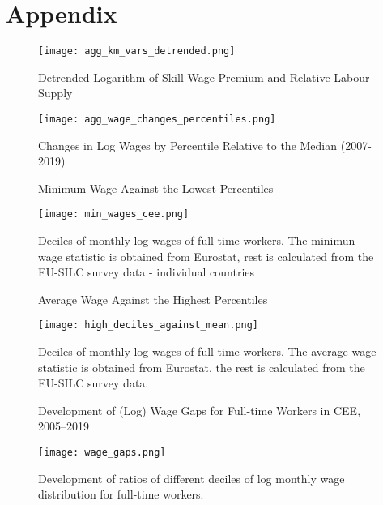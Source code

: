 \documentclass[11pt]{article}
\begin{document}
\newpage
\section{Appendix}



\begin{figure}[!htbp]%
    \centering
    \caption{Detrended Logarithm of Skill Wage Premium and Relative Labour Supply}
    {\texttt{[image: agg\_km\_vars\_detrended.png]} }
    \label{agg_km_vars_detrended}
\end{figure}




\begin{figure}[!htbp]%
    \centering
    \caption{Changes in Log Wages by Percentile Relative to the Median (2007-2019)}
    {\texttt{[image: agg\_wage\_changes\_percentiles.png]} }
    \label{agg_wage_changes_percentiles}
\end{figure}



\begin{figure}[!htbp]%
    \centering
    \caption{Minimum  Wage Against the Lowest Percentiles}
    {\texttt{[image: min\_wages\_cee.png]} }
    \label{low_deciles_vs_min_w_cee}
    \caption*{Deciles of monthly log wages of full-time workers. The minimun wage statistic is obtained from Eurostat, rest is calculated from the EU-SILC survey data - individual countries}
\end{figure}


\begin{figure}[!htbp]%
    \centering
    \caption{Average Wage Against the Highest Percentiles}
    {\texttt{[image: high\_deciles\_against\_mean.png]} }
    \label{high_deciles_vs_meam_w_cee}
    \caption*{\footnotesize Deciles of monthly log wages of full-time workers. The average wage statistic is obtained from Eurostat, the rest is calculated from the EU-SILC survey data. }
\end{figure}



\begin{figure}[!htbp]%
    \centering
    \caption{Development of (Log) Wage Gaps for Full-time Workers in CEE, 2005–2019}
    {\texttt{[image: wage\_gaps.png]} }
    \label{wage_gaps_CEE}
    \caption*{\footnotesize Development of ratios of different deciles of log monthly wage distribution for full-time workers. }
\end{figure}
\end{document}
